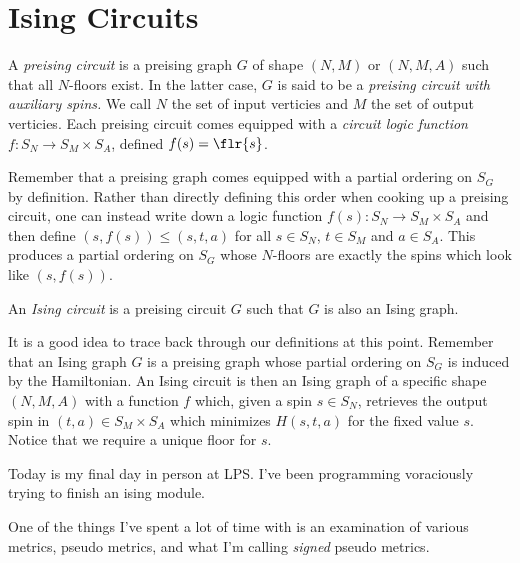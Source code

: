 \newpage

\section{Ising Circuits}
\begin{defn}\label{defn:preising-circuit}
	A \emph{preising circuit} is a preising graph $G$ of shape $(N,M)$ or $(N,M,A)$ such that all $N$-floors exist. In the latter case, $G$ is said to be a \emph{preising circuit with auxiliary spins.} We call $N$ the set of input verticies and $M$ the set of output verticies. Each preising circuit comes equipped with a \emph{circuit logic function} $f:S_N\to S_M\times S_A$, defined $f(s) = \flr{s}$.
\end{defn}
Remember that a preising graph comes equipped with a partial ordering on $S_G$ by definition. Rather than directly defining this order when cooking up a preising circuit, one can instead write down a logic function $f(s):S_N \to S_M\times S_A$ and then define $(s,f(s)) \leq (s,t,a)$ for all $s \in S_N$, $t \in S_M$ and $a \in S_A$. This produces a partial ordering on $S_G$ whose $N$-floors are exactly the spins which look like $(s,f(s))$.

\begin{defn}\label{defn:ising-circuit}
	An \emph{Ising circuit} is a preising circuit $G$ such that $G$ is also an Ising graph.
\end{defn}
\begin{rmk}\label{rmk:ising-circuit-defn}
	It is a good idea to trace back through our definitions at this point. Remember that an Ising graph $G$ is a preising graph whose partial ordering on $S_G$ is induced by the Hamiltonian. An Ising circuit is then an Ising graph of a specific shape $(N,M,A)$ with a function $f$ which, given a spin $s \in S_N$, retrieves the output spin in $(t,a)\in S_M\times S_A$ which minimizes $H(s,t,a)$ for the fixed value $s$. Notice that we require a unique floor for $s$.
\end{rmk}


Today is my final day in person at LPS. I've been programming voraciously trying to finish an ising module.

One of the things I've spent a lot of time with is an examination of various metrics, pseudo metrics, and what I'm calling \emph{signed} pseudo metrics. 


\printbibliography

